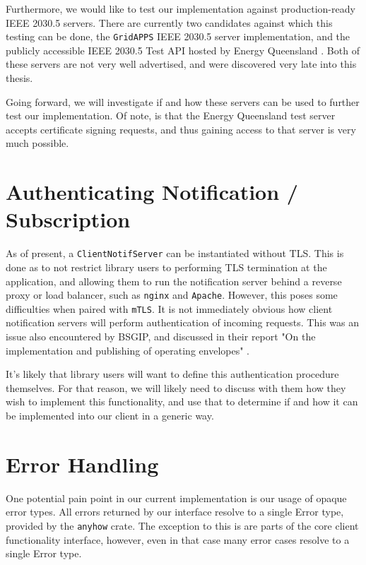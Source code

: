 Furthermore, we would like to test our implementation against production-ready IEEE 2030.5 servers. There are currently two candidates against which this testing can be done, the \texttt{GridAPPS} IEEE 2030.5 server implementation, and the publicly accessible IEEE 2030.5 Test API hosted by Energy Queensland \cite{sep2clienthandbook} \cite{gridapps}. Both of these servers are not very well advertised, and were discovered very late into this thesis.

Going forward, we will investigate if and how these servers can be used to further test our implementation. Of note, is that the Energy Queensland test server accepts certificate signing requests, and thus gaining access to that server is very much possible.

\section{Authenticating Notification / Subscription}
As of present, a \texttt{ClientNotifServer} can be instantiated without TLS. This is done as to not restrict library users to performing TLS termination at the application, and allowing them to run the notification server behind a reverse proxy or load balancer, such as \texttt{nginx} and \texttt{Apache}. 
However, this poses some difficulties when paired with \texttt{mTLS}. It is not immediately obvious how client notification servers will perform authentication of incoming requests. This was an issue also encountered  by BSGIP, and discussed in their report "On the implementation and publishing of operating envelopes" \cite{envoyclient}.

It's likely that library users will want to define this authentication  procedure themselves. For that reason, we will likely need to discuss with them how they wish to implement this functionality, and use that to determine if and how it can be implemented into our client in a generic way.

\section{Error Handling}
One potential pain point in our current implementation is our usage of opaque error types. All errors returned by our interface resolve to a single Error type, provided by the \texttt{anyhow} crate. The exception to this is are parts of the core client functionality interface, however, even in that case many error cases resolve to a single Error type. 

